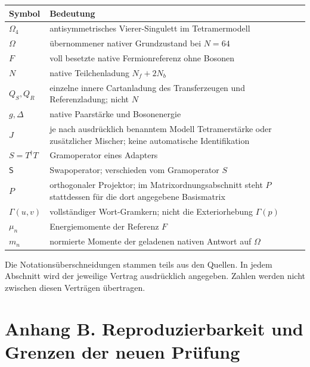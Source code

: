 {\def\LTcaptype{none} %
\begin{longtable}[]{@{}
  >{\raggedright\arraybackslash}p{}
  >{\raggedright\arraybackslash}p{}@{}}
\toprule\noalign{}
\begin{minipage}[b]{\linewidth}\raggedright
Symbol
\end{minipage} & \begin{minipage}[b]{\linewidth}\raggedright
Bedeutung
\end{minipage} \\
\midrule\noalign{}
\endhead
\bottomrule\noalign{}
\endlastfoot
\(\Omega_4\) & antisymmetrisches Vierer-Singulett im Tetramermodell \\
\(\Omega\) & übernommener nativer Grundzustand bei \(N=64\) \\
\(F\) & voll besetzte native Fermionreferenz ohne Bosonen \\
\(N\) & native Teilchenladung \(N_f+2N_b\) \\
\(Q_S,Q_R\) & einzelne innere Cartanladung des Transferzeugen und
Referenzladung; nicht \(N\) \\
\(g,\Delta\) & native Paarstärke und Bosonenergie \\
\(J\) & je nach ausdrücklich benanntem Modell Tetramerstärke oder
zusätzlicher Mischer; keine automatische Identifikation \\
\(S=T^\dagger T\) & Gramoperator eines Adapters \\
\(\mathsf S\) & Swapoperator; verschieden vom Gramoperator \(S\) \\
\(P\) & orthogonaler Projektor; im Matrixordnungsabschnitt steht \(P\)
stattdessen für die dort angegebene Basismatrix \\
\(\Gamma(u,v)\) & vollständiger Wort-Gramkern; nicht die Exteriorhebung
\(\Gamma(p)\) \\
\(\mu_n\) & Energiemomente der Referenz \(F\) \\
\(m_n\) & normierte Momente der geladenen nativen Antwort auf
\(\Omega\) \\
\end{longtable}
}

Die Notationsüberschneidungen stammen teils aus den Quellen. In jedem
Abschnitt wird der jeweilige Vertrag ausdrücklich angegeben. Zahlen
werden nicht zwischen diesen Verträgen übertragen.

\section{Anhang B. Reproduzierbarkeit und Grenzen der neuen
Prüfung}\label{anhang-b.-reproduzierbarkeit-und-grenzen-der-neuen-pruxfcfung}

